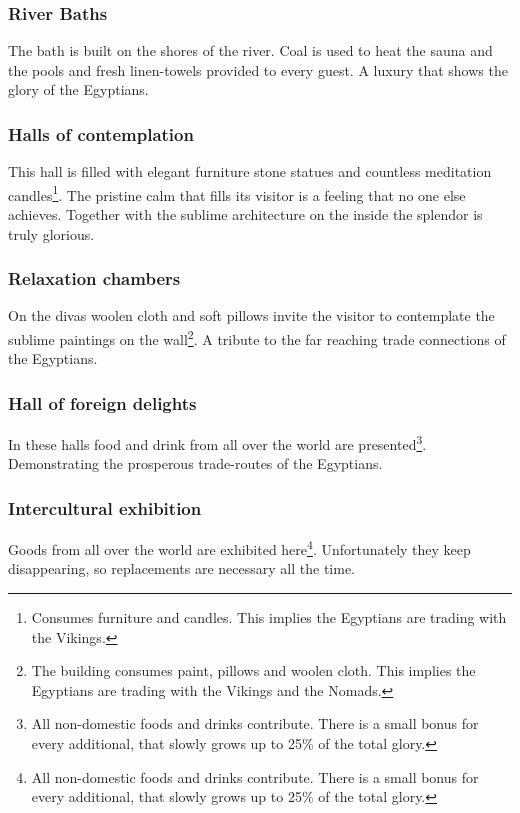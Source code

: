 \documentclass[a4paper]{article}
\begin{document}
		\subsubsection{River Baths}
			The bath is built on the shores of the river.
			Coal is used to heat the sauna and the pools and fresh linen-towels
			provided to every guest.
			A luxury that shows the glory of the \gls{Egyptians}.

		\subsubsection{Halls of contemplation}
			This hall is filled with elegant furniture stone statues and countless meditation
			candles\footnote{
				Consumes furniture and candles.
				This implies the \gls{Egyptians} are trading with the \gls{Vikings}.
			}.
			The pristine calm that fills its visitor is a feeling that no one else achieves.
			Together with the sublime architecture on the inside the splendor is truly glorious.

		\subsubsection{Relaxation chambers}
			On the divas woolen cloth and soft pillows invite the visitor to contemplate
			the sublime paintings on the wall\footnote{
				The building consumes paint, pillows and woolen cloth.
				This implies the \gls{Egyptians} are trading with the \gls{Vikings}
				and the \gls{Nomads}.
			}.
			A tribute to the far reaching trade connections of the \gls{Egyptians}.

		\subsubsection{Hall of foreign delights}
			In these halls food and drink from all over the world are presented\footnote{
				All non-domestic foods and drinks contribute.
				There is a small bonus for every additional,
				that slowly grows up to 25\% of the total glory.
			}.
			Demonstrating the prosperous trade-routes of the \gls{Egyptians}.

		\subsubsection{Intercultural exhibition}
			Goods from all over the world are exhibited here\footnote{
				All non-domestic foods and drinks contribute.
				There is a small bonus for every additional,
				that slowly grows up to 25\% of the total glory.
			}.
			Unfortunately they keep disappearing, so replacements are necessary
			all the time.
\end{document}
